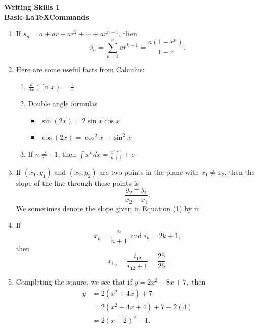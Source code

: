 \documentclass[12pt]{article}
\begin{document}
\begin{center}
\textbf{Writing Skills 1\\
Basic \LaTeX Commands}
\end{center}

\begin{enumerate}
    \item If $s_n = a + ar + ar^2 + \cdots + ar^{n-1}$, then 
        \[s_n = \sum_{k=1}^{n} ar^{k-1} = \frac{a(1-r^n)}{1-r}.\]
    \item Here are some useful facts from Calculus:
        \begin{enumerate}
            \item $\displaystyle \frac{d}{dx}(\ln x) = \frac{1}{x}$
            \item Double angle formulas
                \begin{itemize}
                    \item $\sin(2x) = 2\sin x \cos x$
                    \item $\cos(2x) = \cos^2x - \sin^2x$
                \end{itemize}
            \item If $n \neq -1$, then  $\displaystyle \int x^n dx = \frac{x^{n+1}}{n+1} +c$
        \end{enumerate}
    \item If $(x_1,y_1)$ and $(x_2,y_2)$ are two points in the plane with $x_1 \neq x_2$, then the slope of the line through these points is
    \begin{equation}
        \frac{y_2 - y_1}{x_2 - x_1}
        .
    \end{equation}
    We sometimes denote the slope given in Equation (1) by m.
    \item If \[ x_n = \frac{n}{n+1}  \text{ and }  i_k = 2k+1 ,\] then
                \[x_{i_{12}} = \frac{i_{12}}{i_{12}+1}= \frac{25}{26}.\]
    \item Completing the sqaure, we see that if $y = 2x^2 + 8x +7,$ then 
        \begin{align*}
            y &= 2(x^2 +4x)+7 \\
            &= 2(x^2+4x+4)+7-2(4)\\
            &=2(x+2)^2 -1. 
        \end{align*}
        
        
    
\end{enumerate}
\end{document}
